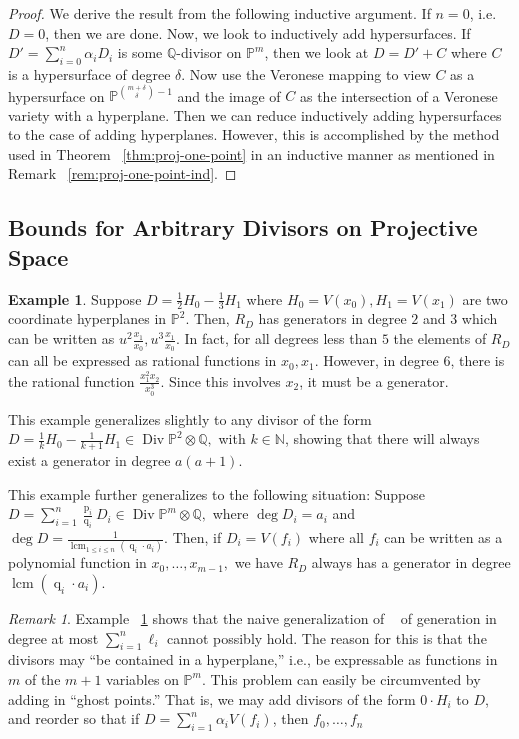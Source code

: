 \documentclass{amsart}
\theoremstyle{plain}
\theoremstyle{definition}
\newtheorem{example}[thm]{Example}
\theoremstyle{remark}
\newtheorem{rem}[thm]{Remark}
\numberwithin{equation}{section}
\newcommand\ssec{\subsection}
\newcommand\bn{{\mathbb N}}
\newcommand\bq{{\mathbb Q}}
\newcommand\bp{{\mathbb P}}
\DeclareMathOperator\di{Div}
\newcommand\bida{a}
\newcommand\pdeg{\delta}
\DeclareMathOperator{\num}{p}
\DeclareMathOperator{\den}{q}
\DeclareMathOperator{\lcm}{lcm}
\begin{document}
\begin{proof}
We derive the result from the following inductive argument.
If $n = 0$, i.e.~ $D = 0$, then we are done.
Now, we look to inductively add hypersurfaces.
If $D' = \sum_{i = 0}^{n} \alpha_i D_i$ is some $\bq$-divisor
on $\bp^m$, then we look at $D = D' + C$ where $C$ is a
hypersurface of degree $\pdeg$.  Now use the Veronese mapping
to view $C$ as a hypersurface on $\bp^{\binom{{m + \pdeg}}{ \pdeg} -1 }$
and the image of $C$ as the intersection of a Veronese variety
with a hyperplane. Then we can reduce inductively adding hypersurfaces
to the case of adding hyperplanes. However, this is accomplished
by the method used in Theorem ~\ref{thm:proj-one-point} in an
inductive manner as mentioned in Remark ~\ref{rem:proj-one-point-ind}.
\end{proof}


\ssec{Bounds for Arbitrary Divisors on Projective Space}

\begin{example}
\label{eg:hyperplane}
Suppose $D = \frac{1}{2}H_0 - \frac{1}{3}H_1$ where $H_0 = V(x_0), H_1 = V(x_1)$ are two coordinate hyperplanes in $\bp^2$. Then, $R_D$ has generators in degree $2$ and $3$ which can be written as $u^2 \frac{x_1}{x_0}, u^3 \frac{x_1}{x_0}.$ In fact, for all degrees less than $5$ the elements of $R_D$ can all be expressed as rational functions in $x_0, x_1$. However, in degree $6$, there is the rational function $\frac{x_1^2 x_2}{x_0^3}.$ Since this involves $x_2$, it must be a generator.

This example generalizes slightly to any divisor of the form $D = \frac{1}{k}H_0 - \frac{1}{k+1}H_1 \in \di \bp^2 \otimes \bq,$ with $k \in \bn$, showing that there will always exist a generator in degree $a(a+1).$

This example further generalizes to the following situation: Suppose $D = \sum_{i=1}^{n} \frac{\num_i}{\den_i}D_i \in \di \bp^m \otimes \bq,$ where $\deg D_i = \bida_i$ and $\deg D = \frac{1}{\lcm_{1 \leq i \leq n}(\den_i \cdot \bida_i)}$. Then, if $D_i = V(f_i)$ where all $f_i$ can be written as a polynomial function in $x_0, \ldots, x_{m-1},$ we have $R_D$ always has a generator in degree $\lcm(\den_i \cdot \bida_i)$.
\end{example}

\begin{rem}
\label{rem:ghost-motivation}
Example ~\ref{eg:hyperplane} shows that the naive generalization of ~\cite[Theorem 8]{dorney:canonical} of generation in degree at most $\sum_{i=1}^{n}\ell_i$ cannot possibly hold. The reason for this is that the divisors may ``be contained in a hyperplane,'' i.e., be expressable as functions in $m$ of the $m+1$ variables on $\bp^m$. This problem can easily be circumvented by adding in ``ghost points.'' That is, we may add divisors of the form $0 \cdot H_i$ to $D$, and reorder so that if $D = \sum_{i=1}^{n}\alpha_i V(f_i)$, then $f_0, \ldots, f_n$
\end{rem}
\end{document}
